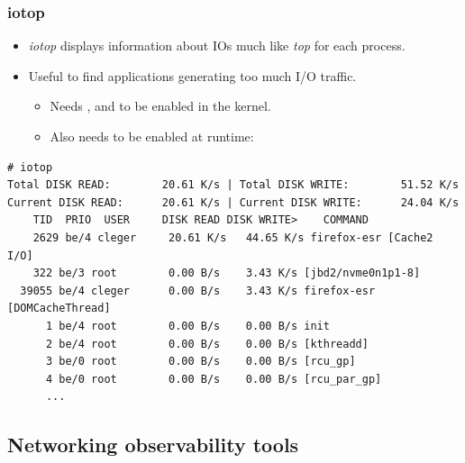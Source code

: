 \begin{frame}[fragile]
  \frametitle{iotop}
  \begin{itemize}
    \item {\em iotop} displays information about IOs much like {\em top} for each
          process.
    \item Useful to find applications generating too much I/O traffic.
    \begin{itemize}
    \item Needs ,
           and
           to be enabled in the
          kernel.
    \item Also needs to be enabled at runtime: 
    \end{itemize}
  \end{itemize}
  \begin{block}{}
    \begin{verbatim}
# iotop
Total DISK READ:        20.61 K/s | Total DISK WRITE:        51.52 K/s
Current DISK READ:      20.61 K/s | Current DISK WRITE:      24.04 K/s
    TID  PRIO  USER     DISK READ DISK WRITE>    COMMAND
    2629 be/4 cleger     20.61 K/s   44.65 K/s firefox-esr [Cache2 I/O]
    322 be/3 root        0.00 B/s    3.43 K/s [jbd2/nvme0n1p1-8]
  39055 be/4 cleger      0.00 B/s    3.43 K/s firefox-esr [DOMCacheThread]
      1 be/4 root        0.00 B/s    0.00 B/s init
      2 be/4 root        0.00 B/s    0.00 B/s [kthreadd]
      3 be/0 root        0.00 B/s    0.00 B/s [rcu_gp]
      4 be/0 root        0.00 B/s    0.00 B/s [rcu_par_gp]
      ...
    \end{verbatim}
  \end{block}
\end{frame}

\subsection{Networking observability tools}

